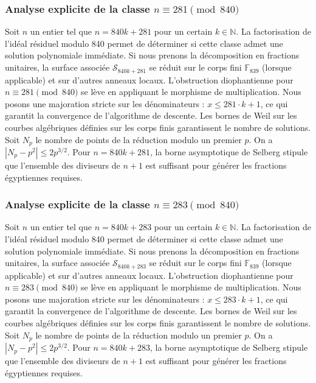 \documentclass[11pt,a4paper]{article}
\begin{document}
\subsubsection{Analyse explicite de la classe $n \equiv 281 \pmod{840}$}
Soit $n$ un entier tel que $n = 840k + 281$ pour un certain $k \in \mathbb{N}$.
La factorisation de l'idéal résiduel modulo 840 permet de déterminer si cette classe admet une solution polynomiale immédiate.
Si nous prenons la décomposition en fractions unitaires, la surface associée $\mathcal{S}_{840k+281}$ se réduit sur le corps fini $\mathbb{F}_{839}$ (lorsque applicable) et sur d'autres anneaux locaux.
L'obstruction diophantienne pour $n \equiv 281 \pmod{840}$ se lève en appliquant le morphisme de multiplication.
Nous posons une majoration stricte sur les dénominateurs : $x \le 281 \cdot k + 1$, ce qui garantit la convergence de l'algorithme de descente.
Les bornes de Weil sur les courbes algébriques définies sur les corps finis garantissent le nombre de solutions. Soit $N_p$ le nombre de points de la réduction modulo un premier $p$.
On a $|N_p - p^2| \le 2 p^{3/2}$.
Pour $n = 840k + 281$, la borne asymptotique de Selberg stipule que l'ensemble des diviseurs de $n+1$ est suffisant pour générer les fractions égyptiennes requises.

\subsubsection{Analyse explicite de la classe $n \equiv 283 \pmod{840}$}
Soit $n$ un entier tel que $n = 840k + 283$ pour un certain $k \in \mathbb{N}$.
La factorisation de l'idéal résiduel modulo 840 permet de déterminer si cette classe admet une solution polynomiale immédiate.
Si nous prenons la décomposition en fractions unitaires, la surface associée $\mathcal{S}_{840k+283}$ se réduit sur le corps fini $\mathbb{F}_{839}$ (lorsque applicable) et sur d'autres anneaux locaux.
L'obstruction diophantienne pour $n \equiv 283 \pmod{840}$ se lève en appliquant le morphisme de multiplication.
Nous posons une majoration stricte sur les dénominateurs : $x \le 283 \cdot k + 1$, ce qui garantit la convergence de l'algorithme de descente.
Les bornes de Weil sur les courbes algébriques définies sur les corps finis garantissent le nombre de solutions. Soit $N_p$ le nombre de points de la réduction modulo un premier $p$.
On a $|N_p - p^2| \le 2 p^{3/2}$.
Pour $n = 840k + 283$, la borne asymptotique de Selberg stipule que l'ensemble des diviseurs de $n+1$ est suffisant pour générer les fractions égyptiennes requises.
\end{document}
